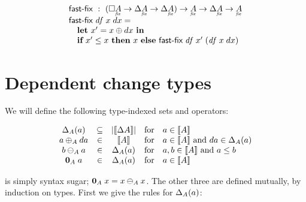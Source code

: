\documentclass{rntz}
\begin{document}
\[\begin{array}{l}
  \textsf{fast-fix} ~:~
  (\Disc{\fixtype{A}} \to \Ch\fixtype{A} \to \Ch\fixtype{A})
  \to \fixtype{A} \to \Ch\fixtype{A} \to \fixtype{A}\\
  \textsf{fast-fix}\; \mi{df}\; x\; dx =\\
  \quad \textbf{let}~ {x' = x \oplus dx}
  ~\textbf{in}\\
  \quad \textbf{if}~ x' \le x
  ~\textbf{then}~ x ~\textbf{else}~ \textsf{fast-fix}\; \mi{df}\; x'
  \;(\mi{df}\; x\; dx)
\end{array}\]


\section{Dependent change types}

We will define the following type-indexed sets and operators:

\[\begin{array}{ccccl}
  \Delta_{A}({a}) &\subseteq& |{\llbracket{\Delta{A}}\rrbracket}|
  &\text{for}& a \in {\llbracket{A}\rrbracket}
  \\
  a \oplus_A da &\in& {\llbracket{A}\rrbracket}
  &\text{for}& a \in {\llbracket{A}\rrbracket} ~\text{and}~ da \in \Delta_{A}({a})
  \\
  b \ominus_A a &\in& \Delta_{A}({a})
  &\text{for}& a, b \in {\llbracket{A}\rrbracket} ~\text{and}~ a \le b
  \\
  \mathbf{0}_A\; a &\in& \Delta_{A}({a})
  &\text{for}& a \in {\llbracket{A}\rrbracket}
\end{array}\]

\zero{} is simply syntax sugar; $\mathbf{0}_A\; x = x \ominus_A x$. The other three
are defined mutually, by induction on types. First we give the rules for
$\Delta_{A}({a})$:
\end{document}
